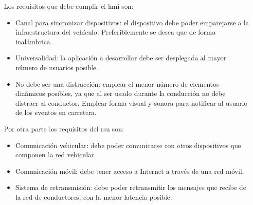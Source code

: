 Los requisitos que debe cumplir el \gls{hmi} son:
\begin{itemize}
	\item Canal para sincronizar dispositivos: el dispositivo debe poder emparejarse a la infraestructura del vehículo. Preferiblemente se desea que de forma inalámbrica.
	
	\item Universalidad: la aplicación a desarrollar debe ser desplegada al mayor número de usuarios posible.
	
	\item No debe ser una distracción: emplear el menor número de elementos dinámicos posibles, ya que al ser usado durante la conducción no debe distraer al conductor. Emplear forma visual y sonora para notificar al usuario de los eventos en carretera.
\end{itemize}

Por otra parte los requisitos del \gls{rsu} son:
\begin{itemize}
	\item Comunicación vehicular: debe poder comunicarse con otros dispositivos que componen la red vehicular.
	
	\item Comunicación móvil: debe tener acceso a Internet a través de una red móvil.
	
	\item Sistema de retransmisión: debe poder retransmitir los mensajes que recibe de la red de conductores, con la menor latencia posible.
\end{itemize}

